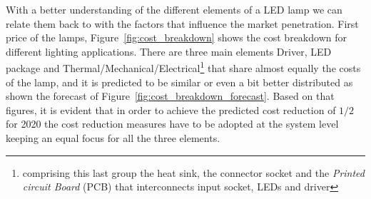 With a better understanding of the different elements of a LED lamp we can relate them back to with the factors that influence the market penetration. First price of the lamps, Figure~\ref{fig:cost_breakdown} shows the cost breakdown for different lighting applications. There are three main elements Driver, LED package and Thermal/Mechanical/Electrical\footnote{comprising this last group the heat sink, the connector socket and the \emph{Printed circuit Board} (PCB) that interconnects input socket, LEDs and driver} that share  almost equally the costs of the lamp, and it is predicted to be similar or even a bit better distributed as shown the forecast of Figure~\ref{fig:cost_breakdown_forecast}. Based on that figures, it is evident that in order to achieve the predicted cost reduction of $1/2$ for 2020 the cost reduction measures have to be adopted at the system level keeping an equal focus for all the three elements. 

